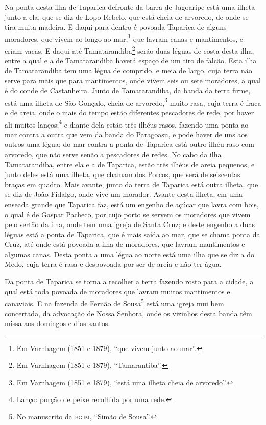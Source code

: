 \begin{linenumbers}
Na ponta desta ilha de Taparica defronte da barra de Jagoaripe está uma ilheta junto a
ela, que se diz de Lopo Rebelo, que está cheia de arvoredo, de onde se tira muita madeira.
E daqui para dentro é povoada Taparica de alguns moradores, que vivem ao longo ao
mar,\footnote{ Em Varnhagem (1851 e 1879), ``que vivem junto ao mar''.} que lavram canas e
mantimentos, e criam vacas. E daqui até Tamatarandiba\footnote{ Em Varnhagem (1851 e
1879), ``Tamarantiba''.} serão duas léguas de costa desta ilha, entre a qual e a de
Tamatarandiba haverá espaço de um tiro de falcão. Esta ilha de Tamatarandiba tem uma légua
de comprido, e meia de largo, cuja terra não serve para mais que para mantimentos, onde
vivem seis ou sete moradores, a qual é do conde de Castanheira. Junto de Tamatarandiba, da
banda da terra firme, está uma ilheta de São Gonçalo, cheia de arvoredo,\footnote{ Em
Varnhagem (1851 e 1879), ``está uma ilheta cheia de arvoredo''.} muito rasa, cuja terra é
fraca e de areia, onde o mais do tempo estão diferentes pescadores de rede, por haver ali
muitos lanços;\footnote{ Lanço: porção de peixe recolhida por uma rede.} e diante dela
estão três ilhéus rasos, fazendo uma ponta ao mar contra a outra que vem da banda do
Paragoasu, e pode haver de uns aos outros uma légua; do mar contra a ponta de Taparica
está outro ilhéu raso com arvoredo, que não serve senão a pescadores de redes. No cabo da
ilha Tamatarandiba, entre ela e a de Taparica, estão três ilhéus de areia pequenos, e
junto deles está uma ilheta, que chamam dos Porcos, que será de seiscentas braças em
quadro. Mais avante, junto da terra de Taparica está outra ilheta, que se diz de João
Fidalgo, onde vive um morador. Avante desta ilheta, em uma enseada grande que Taparica
faz, está um engenho de açúcar que lavra com bois, o qual é de Gaspar Pacheco, por cujo
porto se servem os moradores que vivem pelo sertão da ilha, onde tem uma igreja de Santa
Cruz; e deste engenho a duas léguas está a ponta de Taparica, que é mais saída ao mar, que
se chama ponta da Cruz, até onde está povoada a ilha de moradores, que lavram mantimentos
e algumas canas. Desta ponta a uma légua ao norte está uma ilha que se diz a do Medo, cuja
terra é rasa e despovoada por ser de areia e não ter água.

Da ponta de Taparica se torna a recolher a terra fazendo rosto para a cidade, a qual está
toda povoada de moradores que lavram muitos mantimentos e canaviais. E na fazenda de
Fernão de Sousa\footnote{ No manuscrito da \textsc{bgjm}, ``Simão de Sousa''.} está uma
igreja mui bem concertada, da advocação de Nossa Senhora, onde os vizinhos desta banda têm
missa aos domingos e dias santos.


\end{linenumbers}
